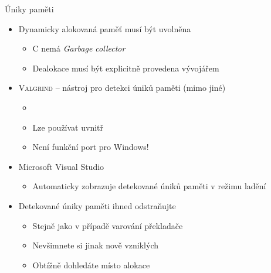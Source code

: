 \begin{frame}{Úniky paměti}

  \begin{itemize}
    \item Dynamicky alokovaná paměť musí být uvolněna
    \begin{itemize}
      \item C nemá \textit{Garbage collector}
      \item Dealokace musí být explicitně provedena vývojářem
    \end{itemize}

    \pause

    \item \textsc{Valgrind} -- nástroj pro detekci úniků paměti (mimo jiné)
    \begin{itemize}
      \item {}
      \item Lze používat uvnitř \qtcu
      \item Není funkční port pro Windows!
    \end{itemize}

    \pause

    \item Microsoft Visual Studio
    \begin{itemize}
      \item Automaticky zobrazuje detekované úniků paměti v režimu ladění
    \end{itemize}

    \pause

    \item Detekované úniky paměti ihned odstraňujte
    \begin{itemize}
      \item Stejně jako v případě varování překladače
      \item Nevšimnete si jinak nově vzniklých
      \item Obtížně dohledáte místo alokace
    \end{itemize}

  \end{itemize}

\end{frame}

